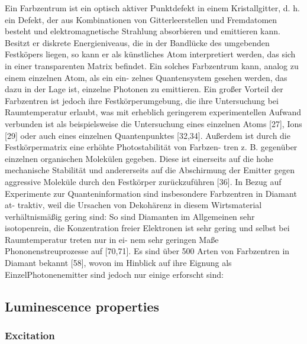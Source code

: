   Ein Farbzentrum ist ein optisch aktiver Punktdefekt in einem Kristallgitter, d. h. ein Defekt, der aus Kombinationen von Gitterleerstellen und Fremdatomen besteht und elektromagnetische Strahlung absorbieren und emittieren kann. Besitzt er diskrete Energieniveaus, die in der Bandlücke des umgebenden Festköpers liegen, so kann er als künstliches Atom interpretiert werden, das sich in einer transparenten Matrix befindet. Ein solches Farbzentrum kann, analog zu einem einzelnen Atom, als ein ein- zelnes Quantensystem gesehen werden, das dazu in der Lage ist, einzelne Photonen zu emittieren. Ein großer Vorteil der Farbzentren ist jedoch ihre Festkörperumgebung, die ihre Untersuchung bei Raumtemperatur erlaubt, was mit erheblich geringerem experimentellen Aufwand verbunden ist als beispielsweise die Untersuchung eines einzelnen Atoms [27], Ions [29] oder auch eines einzelnen Quantenpunktes [32,34]. Außerdem ist durch die Festkörpermatrix eine erhöhte Photostabilität von Farbzen- tren z. B. gegenüber einzelnen organischen Molekülen gegeben. Diese ist einerseits auf die hohe mechanische Stabilität und andererseits auf die Abschirmung der Emitter gegen aggressive Moleküle durch den Festkörper zurückzuführen [36]. In Bezug auf Experimente zur Quanteninformation sind insbesondere Farbzentren in Diamant at- traktiv, weil die Ursachen von Dekohärenz in diesem Wirtsmaterial verhältnismäßig gering sind: So sind Diamanten im Allgemeinen sehr isotopenrein, die Konzentration freier Elektronen ist sehr gering und selbst bei Raumtemperatur treten nur in ei- nem sehr geringen Maße Phononenstreuprozesse auf [70,71]. Es sind über 500 Arten von Farbzentren in Diamant bekannt [58], wovon im Hinblick auf ihre Eignung als EinzelPhotonenemitter sind jedoch nur einige erforscht sind:

  \subsection{Luminescence properties}

    \subsubsection{Excitation}

